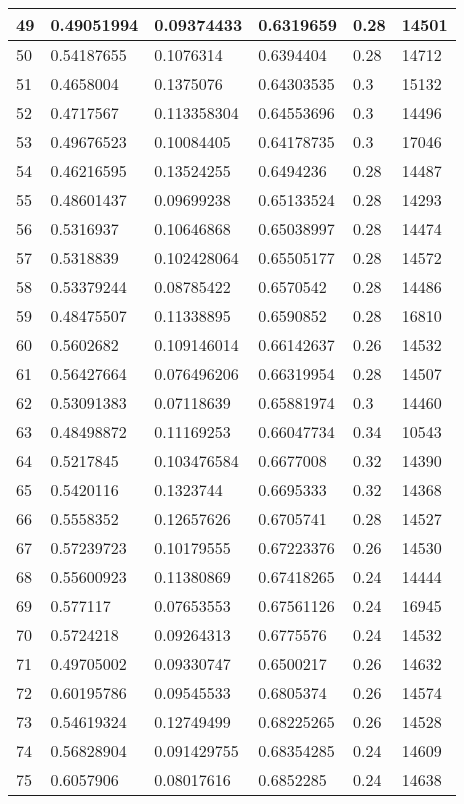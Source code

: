 \begin{longtable}{|l|l|l|l|l|l|}
49 & 0.49051994 & 0.09374433 & 0.6319659 & 0.28 & 14501 \\ \hline 
50 & 0.54187655 & 0.1076314 & 0.6394404 & 0.28 & 14712 \\ \hline 
51 & 0.4658004 & 0.1375076 & 0.64303535 & 0.3 & 15132 \\ \hline 
52 & 0.4717567 & 0.113358304 & 0.64553696 & 0.3 & 14496 \\ \hline 
53 & 0.49676523 & 0.10084405 & 0.64178735 & 0.3 & 17046 \\ \hline 
54 & 0.46216595 & 0.13524255 & 0.6494236 & 0.28 & 14487 \\ \hline 
55 & 0.48601437 & 0.09699238 & 0.65133524 & 0.28 & 14293 \\ \hline 
56 & 0.5316937 & 0.10646868 & 0.65038997 & 0.28 & 14474 \\ \hline 
57 & 0.5318839 & 0.102428064 & 0.65505177 & 0.28 & 14572 \\ \hline 
58 & 0.53379244 & 0.08785422 & 0.6570542 & 0.28 & 14486 \\ \hline 
59 & 0.48475507 & 0.11338895 & 0.6590852 & 0.28 & 16810 \\ \hline 
60 & 0.5602682 & 0.109146014 & 0.66142637 & 0.26 & 14532 \\ \hline 
61 & 0.56427664 & 0.076496206 & 0.66319954 & 0.28 & 14507 \\ \hline 
62 & 0.53091383 & 0.07118639 & 0.65881974 & 0.3 & 14460 \\ \hline 
63 & 0.48498872 & 0.11169253 & 0.66047734 & 0.34 & 10543 \\ \hline 
64 & 0.5217845 & 0.103476584 & 0.6677008 & 0.32 & 14390 \\ \hline 
65 & 0.5420116 & 0.1323744 & 0.6695333 & 0.32 & 14368 \\ \hline 
66 & 0.5558352 & 0.12657626 & 0.6705741 & 0.28 & 14527 \\ \hline 
67 & 0.57239723 & 0.10179555 & 0.67223376 & 0.26 & 14530 \\ \hline 
68 & 0.55600923 & 0.11380869 & 0.67418265 & 0.24 & 14444 \\ \hline 
69 & 0.577117 & 0.07653553 & 0.67561126 & 0.24 & 16945 \\ \hline 
70 & 0.5724218 & 0.09264313 & 0.6775576 & 0.24 & 14532 \\ \hline 
71 & 0.49705002 & 0.09330747 & 0.6500217 & 0.26 & 14632 \\ \hline 
72 & 0.60195786 & 0.09545533 & 0.6805374 & 0.26 & 14574 \\ \hline 
73 & 0.54619324 & 0.12749499 & 0.68225265 & 0.26 & 14528 \\ \hline 
74 & 0.56828904 & 0.091429755 & 0.68354285 & 0.24 & 14609 \\ \hline 
75 & 0.6057906 & 0.08017616 & 0.6852285 & 0.24 & 14638 \\ \hline 
\end{longtable}